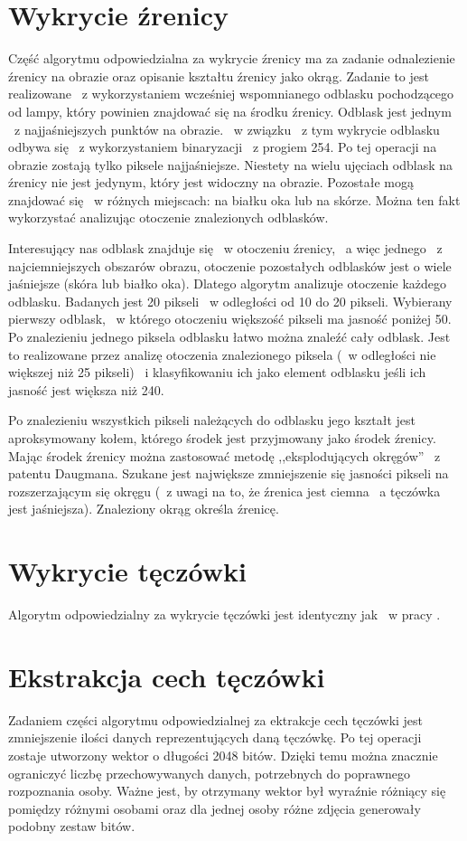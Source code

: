 \section{Wykrycie źrenicy}
\label{sec:wykrycieZrenicy}
Część algorytmu odpowiedzialna za wykrycie źrenicy ma za zadanie odnalezienie źrenicy na obrazie oraz opisanie kształtu źrenicy jako okrąg. Zadanie to jest realizowane ~z wykorzystaniem wcześniej wspomnianego odblasku pochodzącego od lampy, który powinien znajdować się na środku źrenicy. Odblask jest jednym ~z najjaśniejszych punktów na obrazie. ~w związku ~z tym wykrycie odblasku odbywa się ~z wykorzystaniem binaryzacji ~z progiem 254. Po tej operacji na obrazie zostają tylko piksele najjaśniejsze. Niestety na wielu ujęciach odblask na źrenicy nie jest jedynym, który jest widoczny na obrazie. Pozostałe mogą znajdować się ~w różnych miejscach: na białku oka lub na skórze. Można ten fakt wykorzystać analizując otoczenie znalezionych odblasków. 

Interesujący nas odblask znajduje się ~w otoczeniu źrenicy, ~a więc jednego ~z najciemniejszych obszarów obrazu, otoczenie pozostałych odblasków jest o wiele jaśniejsze (skóra lub białko oka). Dlatego algorytm analizuje otoczenie każdego odblasku. Badanych jest 20 pikseli ~w odległości od 10 do 20 pikseli. Wybierany pierwszy odblask, ~w którego otoczeniu większość pikseli ma jasność poniżej 50. Po znalezieniu jednego piksela odblasku łatwo można znaleźć cały odblask. Jest to realizowane przez analizę otoczenia znalezionego piksela (~w odległości nie większej niż 25 pikseli) ~i klasyfikowaniu ich jako element odblasku jeśli ich jasność jest większa niż 240.

Po znalezieniu wszystkich pikseli należących do odblasku jego kształt jest aproksymowany kołem, którego środek jest przyjmowany jako środek źrenicy. Mając środek źrenicy można zastosować metodę ,,eksplodujących okręgów'' ~z patentu Daugmana. Szukane jest największe zmniejszenie się jasności pikseli na rozszerzającym się okręgu (~z uwagi na to, że źrenica jest ciemna ~a tęczówka jest jaśniejsza). Znaleziony okrąg określa źrenicę.

\section{Wykrycie tęczówki}
\label{sec:wykrycieTeczowki}
Algorytm odpowiedzialny za wykrycie tęczówki jest identyczny jak ~w pracy \cite{Gl11}.

\section{Ekstrakcja cech tęczówki}
\label{sec:ekstrakcja}
Zadaniem części algorytmu odpowiedzialnej za ektrakcje cech tęczówki jest zmniejszenie ilości danych reprezentujących daną tęczówkę. Po tej operacji zostaje utworzony wektor o długości 2048 bitów. Dzięki temu można znacznie ograniczyć liczbę przechowywanych danych, potrzebnych do poprawnego rozpoznania osoby. Ważne jest, by otrzymany wektor był wyraźnie różniący się pomiędzy różnymi osobami oraz dla jednej osoby różne zdjęcia generowały podobny zestaw bitów. 

